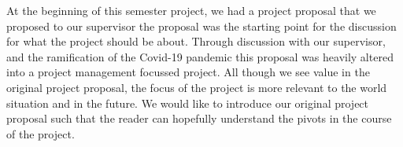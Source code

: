 At the beginning of this semester project, we had a project proposal that we proposed to our supervisor the proposal was the starting point for the discussion for what the project should be about.
Through discussion with our supervisor, and the ramification of the Covid-19 pandemic this proposal was heavily altered into a project management focussed project.
All though we see value in the original project proposal, the focus of the project is more relevant to the world situation and in the future.
We would like to introduce our original project proposal such that the reader can hopefully understand the pivots in the course of the project. 